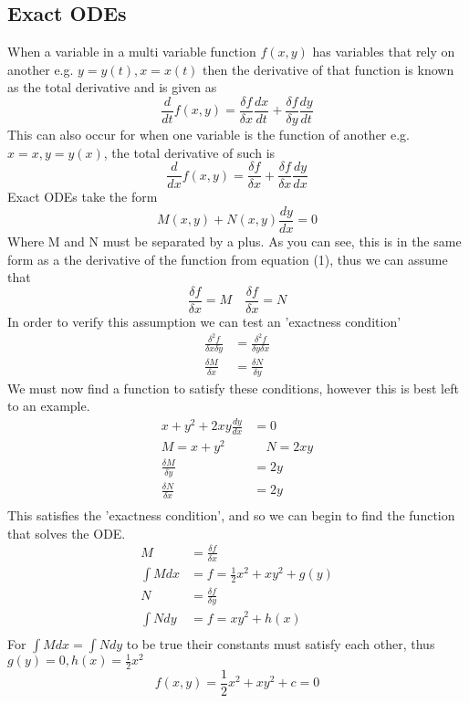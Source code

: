 \documentclass{article}
\begin{document}
\subsection{Exact ODEs}
When a variable in a multi variable function $f(x,y)$ has variables that rely on another e.g. 
$y = y(t), x = x(t)$ then the derivative of that function is known as the total derivative and
 is given as $$\frac{d}{dt}f(x,y) = \frac{\delta f}{\delta x} \frac{dx}{dt} + \frac{\delta f}{\delta y} \frac{dy}{dt}$$
 This can also occur for when one variable is the function of another e.g. $x = x, y = y(x)$, the total derivative of such is 
\begin{equation}
\label{eqn:Total Derivative}
\frac{d}{dx}f(x,y) = \frac{\delta f}{\delta x} + \frac{\delta f}{\delta x} \frac{dy}{dx}
\end{equation}
Exact ODEs take the form $$M(x,y) + N(x,y)\frac{dy}{dx}=0$$
Where M and N must be separated by a plus. 
As you can see, this is in the same form as a the derivative of the function from equation (1),
 thus we can assume that $$\frac{\delta f}{\delta x} = M \quad \frac{\delta f}{\delta x} = N$$
In order to verify this assumption we can test an 'exactness condition' 
\begin{align*}
    \frac{\delta^2f}{\delta x \delta y} &= \frac{\delta^2 f}{\delta y \delta x}\\
    \frac{\delta M}{\delta x} &= \frac{\delta N}{\delta y}
\end{align*}
We must now find a function to satisfy these conditions, however this is best left to an example.
\newpage
\begin{align*}
     x + y^2 + 2xy\frac{dy}{dx} &= 0\\
     M = x + y^2 & \quad N = 2xy\\
     \frac{\delta M}{\delta y} &= 2y\\
     \frac{\delta N}{\delta x} &= 2y\\
\end{align*}
This satisfies the 'exactness condition', and so we can begin to find the function that solves the ODE.
\begin{align*}
    M &= \frac{\delta f}{\delta x}\\
    \int M dx &= f = \frac{1}{2}x^2 + xy^2 + g(y)\\
    N &= \frac{\delta f}{\delta y}\\
    \int N dy &= f = xy^2 + h(x)\\
\end{align*}
For $\int M dx = \int N dy$ to be true their constants must satisfy each other, thus $g(y) = 0, h(x) = \frac{1}{2}x^2$
$$f(x,y) = \frac{1}{2}x^2 + xy^2 + c = 0$$
\end{document}
